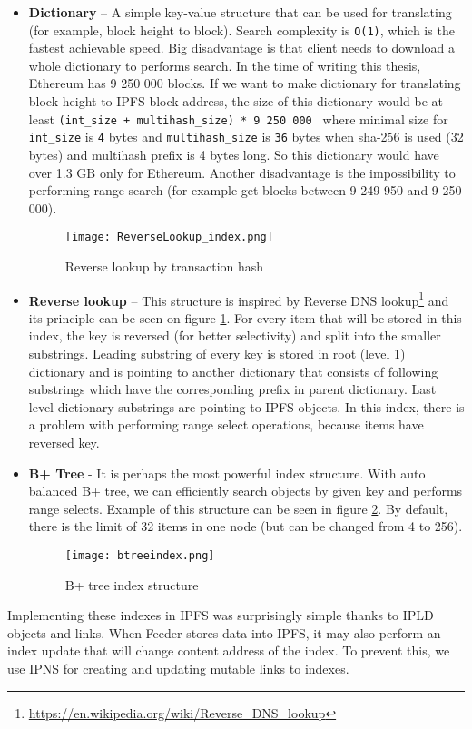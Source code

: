 \begin{itemize}
    \item \textbf{Dictionary} -- A simple key-value structure that can be used for translating (for example, block height to block). Search complexity is \texttt{O(1)}, which is the fastest achievable speed. Big disadvantage is that client needs to download a whole dictionary to performs search. In the time of writing this thesis, Ethereum has 9 250 000 blocks. If we want to make dictionary for translating block height to IPFS block address, the size of this dictionary would be at least \texttt{(int\_size + multihash\_size) * 9 250 000 } where minimal size for \texttt{int\_size} is \texttt{4} bytes and \texttt{multihash\_size} is \texttt{36} bytes when sha-256 is used (32 bytes) and multihash prefix is 4 bytes long. So this dictionary would have over 1.3 GB only for Ethereum. Another disadvantage is the impossibility to performing range search (for example get blocks between 9 249 950 and 9 250 000).

    \begin{figure}[h]
        \centering
        \texttt{[image: ReverseLookup\_index.png]}
        \caption{Reverse lookup by transaction hash}
        \label{reverseLookupIndex}
    \end{figure}

    \item \textbf{Reverse lookup} -- This structure is inspired by Reverse DNS lookup\footnote{\url{https://en.wikipedia.org/wiki/Reverse_DNS_lookup}} and its principle can be seen on figure \ref{reverseLookupIndex}. For every item that will be stored in this index, the key is reversed (for better selectivity) and split into the smaller substrings. Leading substring of every key is stored in root (level 1) dictionary and is pointing to another dictionary that consists of following substrings which have the corresponding prefix in parent dictionary. Last level dictionary substrings are pointing to IPFS objects. In this index, there is a problem with performing range select operations, because items have reversed key.
    
    \item \textbf{B+ Tree} - It is perhaps the most powerful index structure. With auto balanced B+ tree, we can efficiently search objects by given key and performs range selects. Example of this structure can be seen in figure \ref{btreeindex}. By default, there is the limit of 32 items in one node (but can be changed from 4 to 256). 
    


    \begin{figure}[h]
        \centering
        \texttt{[image: btreeindex.png]}
        \caption{B+ tree index structure}
        \label{btreeindex}
    \end{figure}

\end{itemize}
Implementing these indexes in IPFS was surprisingly simple thanks to IPLD objects and links. When Feeder stores data into IPFS, it may also perform an index update that will change content address of the index. To prevent this, we use IPNS for creating and updating mutable links to indexes.



